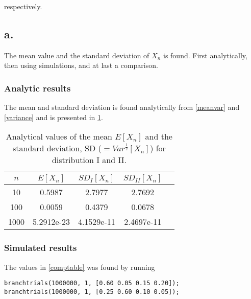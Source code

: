 respectively. 

\subsection*{a.}
The mean value and the standard deviation of $X_n$ is found. First analytically, then using simulations, and at last a comparison.

\subsubsection{Analytic results}
The mean and standard deviation is found analytically from \cref{meanvar} and \cref{variance} and is presented in \cref{anatable}.

\begin{table}[!htbp]
\centering
\begin{tabular}{ccccc}
  \hline
  \noalign{\smallskip}
  $n$ & $E[X_n]$ & $SD_I[X_n]$ & $SD_{II}[X_n]$   \\
  \hline
  \noalign{\smallskip}
  10   & 0.5987 & 2.7977 & 2.7692 &    \\
  100  & 0.0059 & 0.4379 & 0.0678 &    \\
  1000 & 5.2912e-23 & 4.1529e-11 & 2.4697e-11 &    \\
  \hline
\end{tabular}
\caption{Analytical values of the mean $E[X_n]$ and the standard deviation, SD ($=Var^{\frac{1}{2}}[X_n]$) for distribution I and II.}
\label{anatable}
\end{table}


\subsubsection{Simulated results}

The values in \cref{comptable} was found by running

\begin{verbatim}
branchtrials(1000000, 1, [0.60 0.05 0.15 0.20]);
branchtrials(1000000, 1, [0.25 0.60 0.10 0.05]);
\end{verbatim}

